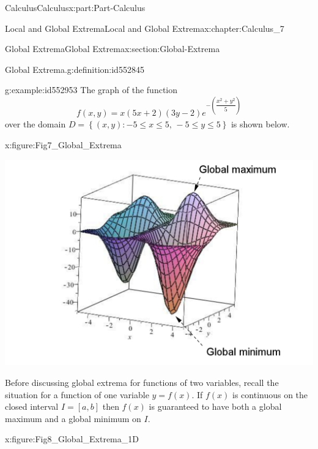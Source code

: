 \documentclass[oneside,10pt,]{book}
\numberwithin{equation}{section}
\begin{document}
\begin{partptx}{Calculus}{}{Calculus}{}{}{x:part:Part-Calculus}
\begin{chapterptx}{Local and Global Extrema}{}{Local and Global Extrema}{}{}{x:chapter:Calculus_7}
\begin{sectionptx}{Global Extrema}{}{Global Extrema}{}{}{x:section:Global-Extrema}
\begin{definition}{Global Extrema.}{g:definition:id552845}
%
\end{definition}
\begin{example}{}{g:example:id552953}%
The graph of the function%
\begin{equation*}
f(x,y) = x(5x+2)(3y-2)e^{-\left( \dfrac{x^2+y^2}{5} \right)}
\end{equation*}
over the domain \(D = \left \{ (x,y): -5 \leq x \leq 5, \, -5 \leq y \leq 5 \right \}\) is shown below.%
\begin{figureptx}{}{x:figure:Fig7_Global_Extrema}{}%
\begin{image}{0.1}{0.8}{0.1}%
\includegraphics[width=\linewidth]{./Calculus/Images/7/Fig7_Global_Extrema.png}
\end{image}%
\tcblower
\end{figureptx}%
\end{example}
Before discussing global extrema for functions of two variables, recall the situation for a function of one variable \(y=f(x)\). If \(f(x)\) is continuous on the closed interval \(I=[a,b]\) then \(f(x)\) is guaranteed to have both a global maximum and a global minimum on \(I\).%
\begin{figureptx}{}{x:figure:Fig8_Global_Extrema_1D}{}%
\begin{image}{0.1}{0.8}{0.1}%

\end{image}
\end{figureptx}
\end{sectionptx}
\end{chapterptx}
\end{partptx}
\end{document}

